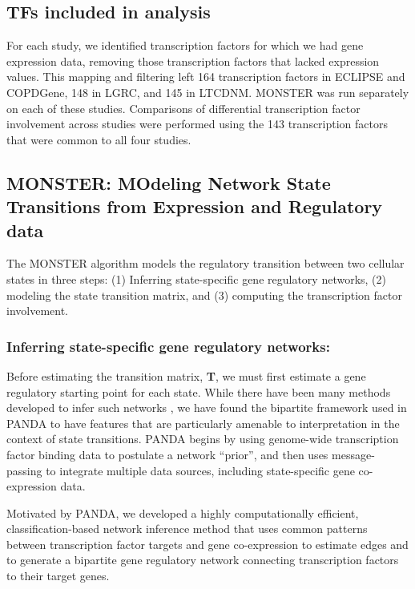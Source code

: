 \subsection*{TFs included in analysis} For each study, we identified transcription factors for which we had gene expression data, removing those transcription factors that lacked expression values. This mapping and filtering left 164 transcription factors in ECLIPSE and COPDGene, 148 in LGRC, and 145 in LTCDNM. MONSTER was run separately on each of these studies. Comparisons of differential transcription factor involvement across studies were performed using the 143 transcription factors that were common to all four studies.

\subsection*{MONSTER: MOdeling Network State Transitions from Expression and Regulatory data}

The MONSTER algorithm models the regulatory transition between two cellular states in three  steps: (1) Inferring state-specific gene regulatory networks, (2) modeling the state transition matrix, and (3) computing the transcription factor involvement.

\subsubsection*{Inferring state-specific gene regulatory networks:} Before estimating the transition matrix, \textbf{T}, we must first estimate a gene regulatory starting point for each state. While there have been many methods developed to infer such networks \cite{hill2012bayesian, glass2014sexually, glass2015network, eduati2012integrating, chen2009input, molinelli2013perturbation, saez2011comparing}, we have found the bipartite framework used in PANDA \cite{glass2013passing} to have features that are particularly amenable to interpretation in the context of state transitions. PANDA begins by using genome-wide transcription factor binding data to postulate a network ``prior'', and then uses message-passing  to integrate multiple data sources, including state-specific gene co-expression data. 

Motivated by PANDA, we developed a highly computationally efficient, classification-based network inference method that uses common patterns between transcription factor targets and gene co-expression to estimate edges and to generate a bipartite gene regulatory network connecting transcription factors to their target genes.

